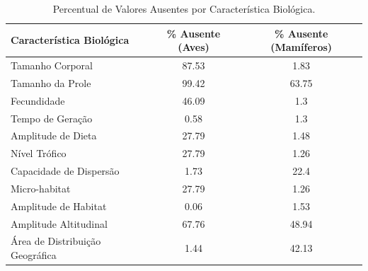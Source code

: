 \begin{table}[htbp]
\centering
\caption{Percentual de Valores Ausentes por Característica Biológica.}
\label{tab:valores_ausentes}
\begin{tabular}{lcc}
\hline
\textbf{Característica Biológica} & \textbf{\% Ausente (Aves)} & \textbf{\% Ausente (Mamíferos)} \\
\hline
Tamanho Corporal & 87.53 & 1.83 \\
Tamanho da Prole & 99.42 & 63.75 \\
Fecundidade & 46.09 & 1.3 \\
Tempo de Geração & 0.58 & 1.3 \\
Amplitude de Dieta & 27.79 & 1.48 \\
Nível Trófico & 27.79 & 1.26 \\
Capacidade de Dispersão & 1.73 & 22.4 \\
Micro-habitat & 27.79 & 1.26 \\
Amplitude de Habitat & 0.06 & 1.53 \\
Amplitude Altitudinal & 67.76 & 48.94 \\
Área de Distribuição Geográfica & 1.44 & 42.13 \\
\hline
\end{tabular}
\end{table}
